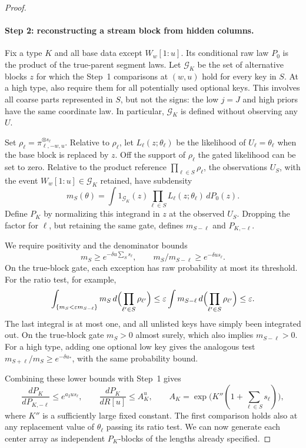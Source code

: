 \begin{proof}
\paragraph{Step 2: reconstructing a stream block from hidden columns.}
Fix a type \(K\) and all base data except \(W_w[1:u]\). Its conditional
raw law \(P_0\) is the product of the true-parent segment laws. Let
\(\mathcal G_K\) be the set of alternative blocks \(z\) for which the
Step~1 comparisons at \((w,u)\) hold for every key in \(S\). At a high
type, also require them for all potentially used optional keys. This
involves all coarse parts represented in \(S\), but not the signs:
the low \(j=J\) and high priors have the same coordinate law. In
particular, \(\mathcal G_K\) is defined without observing any \(U\).

Set \(\rho_\ell=\pi_{\ell,-w,u}^{\otimes s_\ell}\). Relative to
\(\rho_\ell\), let \(L_\ell(z;\theta_\ell)\) be the likelihood of
\(U_\ell=\theta_\ell\) when the base block is replaced by \(z\).
Off the support of \(\rho_\ell\) the gated likelihood can be set to
zero. Relative to the product reference \(\prod_{\ell\in S}\rho_\ell\),
the observations \(U_S\), with the event
\(W_w[1:u]\in\mathcal G_K\) retained, have subdensity
\[
 m_S(\theta)=\int1_{\mathcal G_K}(z)
       \prod_{\ell\in S}L_\ell(z;\theta_\ell)\,dP_0(z).
\]
Define \(P_K\) by normalizing this integrand in \(z\) at the observed
\(U_S\). Dropping the factor for \(\ell\), but retaining the same
gate, defines \(m_{S-\ell}\) and \(P_{K,-\ell}\).

We require positivity and the denominator bounds
\[
 m_S\ge e^{-\delta u\sum_Ss_\ell},\qquad
 m_S/m_{S-\ell}\ge e^{-\delta us_\ell}.
\]
On the true-block gate, each exception has raw probability at most its
threshold. For the ratio test, for example,
\[
 \int_{\{m_S<\varepsilon m_{S-\ell}\}}m_S
       \,d\Bigl(\prod_{\ell'\in S}\rho_{\ell'}\Bigr)
 \le\varepsilon\int m_{S-\ell}
       \,d\Bigl(\prod_{\ell'\in S}\rho_{\ell'}\Bigr)
 \le\varepsilon.
\]
The last integral is at most one, and all unlisted keys have simply been
integrated out. On the true-block gate \(m_S>0\) almost surely, which
also implies \(m_{S-\ell}>0\). For a high type, adding one optional low
key gives the analogous test
\(m_{S+\ell}/m_S\ge e^{-\delta u_*}\), with the same probability
bound.

Combining these lower bounds with Step~1 gives
\[
 \frac{dP_K}{dP_{K,-\ell}}\le e^{a_2us_\ell},\qquad
 \frac{dP_K}{dR[u]}\le A_K^u,\qquad
 A_K=\exp\bigl(K''(1+\sum_{\ell\in S}s_\ell)\bigr),
\]
where \(K''\) is a sufficiently large fixed constant. The first
comparison holds also at any replacement value of \(\theta_\ell\)
passing its ratio test. We can now generate each center array as
independent \(P_K\)-blocks of the lengths already specified.


\end{proof}
